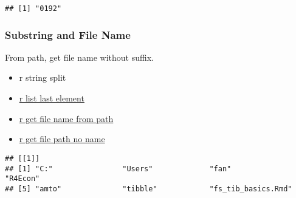 \documentclass[
]{book}
\newenvironment{Shaded}{\begin{snugshade}}{\end{snugshade}}
\newcommand{\CharTok}[1]{\textcolor[rgb]{0.31,0.60,0.02}{#1}}
\newcommand{\DataTypeTok}[1]{\textcolor[rgb]{0.13,0.29,0.53}{#1}}
\newcommand{\DecValTok}[1]{\textcolor[rgb]{0.00,0.00,0.81}{#1}}
\newcommand{\KeywordTok}[1]{\textcolor[rgb]{0.13,0.29,0.53}{\textbf{#1}}}
\newcommand{\NormalTok}[1]{#1}
\newcommand{\StringTok}[1]{\textcolor[rgb]{0.31,0.60,0.02}{#1}}
\providecommand{\tightlist}{%
  \setlength{\itemsep}{0pt}\setlength{\parskip}{0pt}}
\begin{document}
\begin{verbatim}
## [1] "0192"
\end{verbatim}

\hypertarget{substring-and-file-name}{%
\subsubsection{Substring and File Name}\label{substring-and-file-name}}

From path, get file name without suffix.

\begin{itemize}
\tightlist
\item
  r string split
\item
  \href{https://stackoverflow.com/a/83222/8280804}{r list last element}
\item
  \href{https://stackoverflow.com/a/29114007/8280804}{r get file name from path}
\item
  \href{https://stackoverflow.com/a/47189541/8280804}{r get file path no name}
\end{itemize}

\begin{Shaded}
\end{Shaded}

\begin{verbatim}
## [[1]]
## [1] "C:"                "Users"             "fan"               "R4Econ"           
## [5] "amto"              "tibble"            "fs_tib_basics.Rmd"
\end{verbatim}
\end{document}
